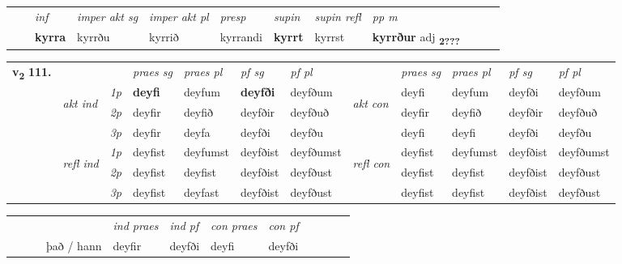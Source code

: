 \begin{tabular}{llllllllllll}
 & & \textit{inf} & \textit{imper akt sg} & \textit{imper akt pl}   & \textit{presp} & \textit{supin} & \textit{supin refl} & \textit{pp m}     \\*
  & & \textbf{kyrra} & kyrrðu  & kyrrið   & kyrrandi &  \textbf{kyrrt} & kyrrst & \textbf{kyrrður} adj \textbf{\textsubscript{2???}} \\*
\cmidrule{1-12}
\end{tabular}



\begin{tabular}{llllllllllll} \toprule
\multirow{4}{*}{{{\textbf{v{\textsubscript{2}}} \Large{\textbf{111.}}}}}  & &   &  \textit{praes sg}  & \textit{praes pl}  &\textit{ pf sg} & \textit{pf pl} &  &  \textit{praes sg}  & \textit{praes pl}  & \textit{pf sg} & \textit{pf pl } \\*
	\cmidrule{4-7} \cmidrule{9-12}
 & \multirow{3}{*}{\begin{turn}{90}\textit{akt ind}\end{turn}} & {\textit{1p}} & \textbf{deyfi} & deyfum    & \textbf{deyfði} & deyfðum & \multirow{3}{*}{\begin{turn}{90}\textit{akt con}\end{turn}} &deyfi & deyfum & deyfði & deyfðum\\*
& &  {\textit{2p}} &  deyfir  & deyfið   & deyfðir & deyfðuð & & deyfir & deyfið & deyfðir & deyfðuð \\*
& &  {\textit{3p}} & deyfir & deyfa   & deyfði & deyfðu & & deyfi & deyfi& deyfði & deyfðu  \\*
\cmidrule{4-7} \cmidrule{9-12}
 &\multirow{3}{*}{\begin{turn}{90}\textit{refl ind}\end{turn}} & {\textit{1p}} & deyfist & deyfumst    & deyfðist & deyfðumst & \multirow{3}{*}{\begin{turn}{90}\textit{refl con}\end{turn}}  &deyfist & deyfumst & deyfðist & deyfðumst\\*
 &&  {\textit{2p}} &  deyfist  & deyfist   & deyfðist & deyfðust & &deyfist & deyfist & deyfðist & deyfðust \\*
& &  {\textit{3p}} & deyfist & deyfast   & deyfðist & deyfðust & & deyfist & deyfist& deyfðist & deyfðust  \\*
\cmidrule{4-7} \cmidrule{9-12}
\end{tabular}


\begin{tabular}{llllllllllll}
 & &  & &  \textit{ind praes} & \textit{ind pf} & \textit{con praes} & \textit{con pf} \\*
&  & & það / hann & deyfir & deyfði & deyfi & deyfði \\*
\cmidrule{5-9}
\end{tabular}


